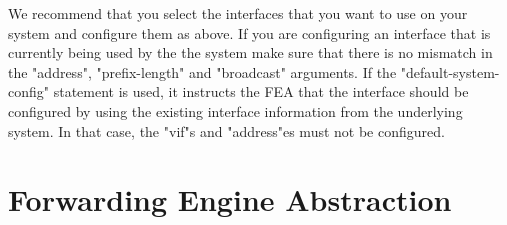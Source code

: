 \documentclass[11pt]{article}
\begin{document}
\vspace{0.1in}
\noindent{}
\vspace{0.1in}

We recommend that you select the interfaces that you want to use on
your system and configure them as above. If you are configuring an
interface that is currently being used by the the system make sure
that there is no mismatch in the "address", "prefix-length" and
"broadcast" arguments.
If the "default-system-config" statement is used, it
instructs the FEA that the interface should be configured by using
the existing interface information from the underlying system.
In that case, the "vif"s and "address"es must not be configured.

\section{Forwarding Engine Abstraction}
\end{document}
